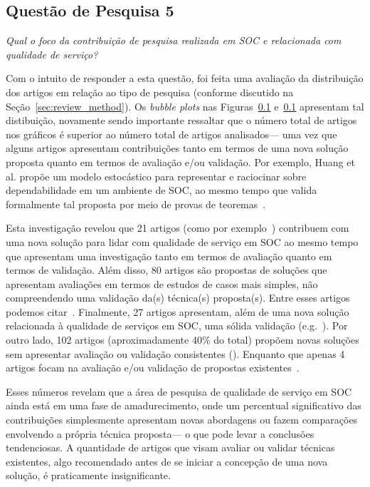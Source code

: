 \subsection{Questão de Pesquisa 5}

\emph{Qual o foco da contribuição de pesquisa realizada em SOC e relacionada com qualidade de serviço? }

Com o intuito de responder a esta questão, foi feita uma avalia\c c\~{a}o da distribui\c c\~{a}o dos 
artigos em rela\c c\~{a}o ao tipo de pesquisa (conforme discutido na Se\c c\~{a}o~\ref{sec:review_method}). 
Os \emph{bubble plots} nas Figuras~\ref{} e~\ref{}  apresentam tal distibui\c c\~{a}o, novamente sendo importante 
ressaltar que o n\'{u}mero total de artigos nos gr\'{a}ficos \'{e} superior ao n\'{u}mero total de artigos analisados--- 
uma vez que alguns artigos apresentam contribui\c c\~{o}es tanto em termos de uma nova solu\c c\~{a}o proposta 
quanto em termos de avalia\c c\~{a}o e/ou valida\c c\~{a}o. Por exemplo, Huang et al. prop\~{o}e um 
modelo estoc\'{a}stico para representar e raciocinar sobre dependabilidade em um ambiente de SOC, ao mesmo tempo 
que valida formalmente tal proposta por meio de provas de teoremas~\cite{huang:scc2011}.

Esta investiga\c c\~{a}o revelou que 21 artigos (como por exemplo~\cite{jeong:fqs2009,ardagna:jss2010}) 
contribuem com uma nova solu\c c\~{a}o para 
lidar com qualidade de servi\c co em SOC ao mesmo tempo que apresentam uma investiga\c c\~{a}o tanto 
em termos de avalia\c c\~{a}o quanto em termos de valida\c c\~{a}o. Al\'{e}m disso, 80 
artigos s\~{a}o propostas de solu\c c\~{o}es que apresentam 
avalia\c c\~{o}es em termos de estudos de casos mais simples, n\~{a}o compreendendo uma 
valida\c c\~{a}o da(s) t\'{e}cnica(s) proposta(s). Entre esses artigos podemos 
citar~\cite{filieri:faa2012, pernici:services2011,nascimento:splc2011}. Finalmente, 27 artigos apresentam, 
al\'{e}m de uma nova solu\c c\~{a}o relacionada \`{a} qualidade de servi\c cos em SOC, 
uma s\'{o}lida valida\c c\~{a}o (e.g.~\cite{huang:scc2011,binshtok:icsoc2009}).    
Por outro lado, 102 artigos (aproximadamente 40\% do total) prop\~{o}em novas 
solu\c c\~{o}es sem apresentar avalia\c c\~{a}o ou valida\c c\~{a}o consistentes (\cite{balfagih:icime2011,fiadeiro:fac2011,khazankin:scc2011}). 
Enquanto que apenas 4 artigos focam na avalia\c c\~{a}o e/ou valida\c c\~{a}o de 
propostas existentes~\cite{voelz:edoc2010,moayed:icsea2010,cavallo:pesos2010,banerjee:isorcw2011}.  

Esses n\'{u}meros revelam que a \'{a}rea de pesquisa de qualidade de servi\c co em 
SOC ainda est\'{a} em uma fase 
de amadurecimento, onde um percentual significativo das contribui\c c\~{o}es 
simplesmente apresentam novas abordagens ou fazem compara\c c\~{o}es envolvendo a 
pr\'{o}pria t\'{e}cnica proposta--- o que pode levar a conclus\~{o}es tendenciosas. A quantidade 
de artigos que visam avaliar ou validar t\'{e}cnicas existentes, algo recomendado antes 
de se iniciar a concep\c c\~{a}o de uma nova solu\c c\~{a}o, \'{e} praticamente insignificante. 
 
